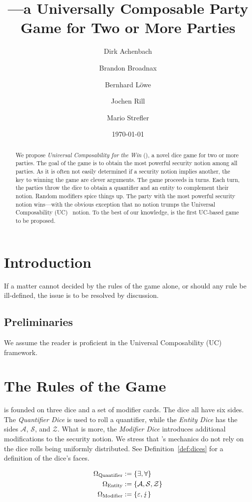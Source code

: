 \documentclass{llncs}
\title{\ucftw---a Universally Composable Party Game for Two or More Parties}
\date{\today}
\author{Dirk Achenbach\inst{1} \and Brandon Broadnax\inst{1} \and Bernhard Löwe\inst{1} \and Jochen Rill\inst{2} \and Mario Strefler\inst{1}}
\institute{Karlsruhe Institute of Technology (KIT) \and FZI Forschungszentrum Informatik}
\begin{document}
\maketitle
\begin{abstract}
	We propose \emph{Universal Composability for the Win} (\ucftw), a novel dice game for two or more parties. 
	The goal of the game is to obtain the most powerful security notion among all parties. 
	As it is often not easily determined if a security notion implies another, the key to winning the game are clever arguments.
	The game proceeds in turns. 
	Each turn, the parties throw the dice to obtain a quantifier and an entity to complement their notion. 
	Random modifiers spice things up.
	The party with the most powerful security notion wins---with the obvious exception that no notion trumps the Universal Composability (UC)~\cite{can01,can05,can13} notion.
	To the best of our knowledge, \ucftw is the first UC-based game to be proposed.
\end{abstract}

\section{Introduction}
\begin{theorem}
  If a matter cannot decided by the rules of the game alone, or should any rule be ill-defined, the issue is to be resolved by discussion.
\end{theorem}

\subsection{Preliminaries}
We assume the reader is proficient in the Universal Composability (UC)~\cite{can01,can05,can13} framework.

\section{The Rules of the Game}
\ucftw is founded on three dice and a set of modifier cards.
The dice all have six sides.
The \emph{Quantifier Dice} is used to roll a quantifier, while the \emph{Entity Dice} has the sides $\mathcal{A}$, $\mathcal{S}$, and $\mathcal{Z}$.
What is more, the \emph{Modifier Dice} introduces additional modifications to the security notion.
We stress that \ucftw's mechanics do not rely on the dice rolls being uniformly distributed.
See Definition~\ref{def:dices} for a definition of the dice's faces.
\begin{definition}
	\begin{align*}
		\Omega_\text{Quantifier} &:= \{\exists, \forall\}  \\
		\Omega_\text{Entity} &:= \{\mathcal{A}, \mathcal{S}, \mathcal{Z}\}  \\
		\Omega_\text{Modifier} &:= \{\varepsilon, \lightning\} 
	\end{align*}
	\label{def:dices}
\end{definition}
\end{document}
